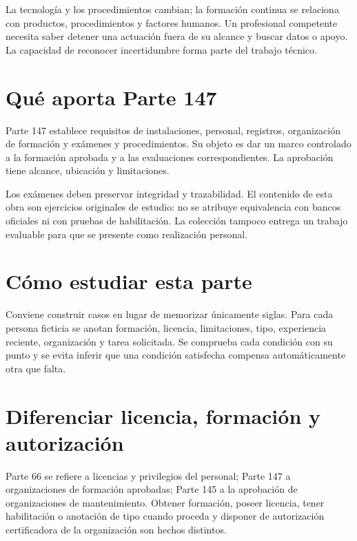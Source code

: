 La tecnología y los procedimientos cambian; la formación continua se relaciona con productos, procedimientos y factores humanos. Un profesional competente necesita saber detener una actuación fuera de su alcance y buscar datos o apoyo. La capacidad de reconocer incertidumbre forma parte del trabajo técnico.
\section{Qué aporta Parte 147}
Parte 147 establece requisitos de instalaciones, personal, registros, organización de formación y exámenes y procedimientos. Su objeto es dar un marco controlado a la formación aprobada y a las evaluaciones correspondientes. La aprobación tiene alcance, ubicación y limitaciones.

Los exámenes deben preservar integridad y trazabilidad. El contenido de esta obra son ejercicios originales de estudio: no se atribuye equivalencia con bancos oficiales ni con pruebas de habilitación. La colección tampoco entrega un trabajo evaluable para que se presente como realización personal.
\section{Cómo estudiar esta parte}
Conviene construir casos en lugar de memorizar únicamente siglas. Para cada persona ficticia se anotan formación, licencia, limitaciones, tipo, experiencia reciente, organización y tarea solicitada. Se comprueba cada condición con su punto y se evita inferir que una condición satisfecha compensa automáticamente otra que falta.
\section{Diferenciar licencia, formación y autorización}
Parte 66 se refiere a licencias y privilegios del personal; Parte 147 a organizaciones de formación aprobadas; Parte 145 a la aprobación de organizaciones de mantenimiento. Obtener formación, poseer licencia, tener habilitación o anotación de tipo cuando proceda y disponer de autorización certificadora de la organización son hechos distintos.

